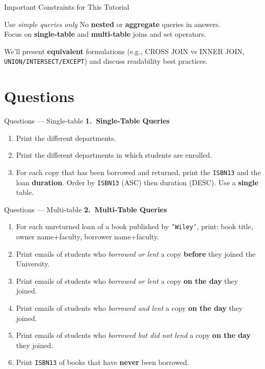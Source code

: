 \documentclass{beamer}
\begin{document}
\begin{frame}{Important Constraints for This Tutorial}
\Large
\begin{block}{Use \emph{simple queries only}}
No \textbf{nested} or \textbf{aggregate} queries in answers. \\
Focus on \textbf{single-table} and \textbf{multi-table} joins and set operators.
\end{block}
\normalsize
We’ll present \textbf{equivalent} formulations (e.g., CROSS JOIN vs INNER JOIN, \texttt{UNION/INTERSECT/EXCEPT}) and discuss readability best practices.
\end{frame}
\section{Questions}
\begin{frame}{Questions — Single-table}
\footnotesize
\textbf{1.\ Single-Table Queries}
\begin{enumerate}\itemsep2pt
  \item[(a)] Print the different departments.
  \item[(b)] Print the different departments in which students are enrolled.
  \item[(c)] For each copy that has been borrowed and returned, print the \texttt{ISBN13} and the loan \textbf{duration}. Order by \texttt{ISBN13} (ASC) then duration (DESC). Use a \textbf{single} table.
\end{enumerate}
\end{frame}

\begin{frame}{Questions — Multi-table}
\footnotesize
\textbf{2.\ Multi-Table Queries}
\begin{enumerate}\itemsep2pt
  \item[(a)] For each unreturned loan of a book published by \texttt{'Wiley'}, print: book title, owner name+faculty, borrower name+faculty.
  \item[(b)] Print emails of students who \emph{borrowed or lent} a copy \textbf{before} they joined the University.
  \item[(c)] Print emails of students who \emph{borrowed or lent} a copy \textbf{on the day} they joined.
  \item[(d)] Print emails of students who \emph{borrowed and lent} a copy \textbf{on the day} they joined.
  \item[(e)] Print emails of students who \emph{borrowed but did not lend} a copy \textbf{on the day} they joined.
  \item[(f)] Print \texttt{ISBN13} of books that have \textbf{never} been borrowed.
\end{enumerate}
\end{frame}
\end{document}
